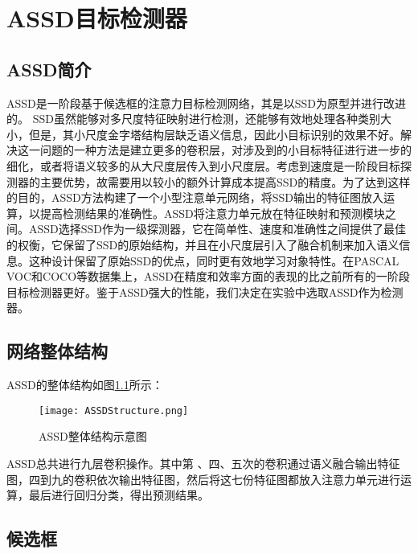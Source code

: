 
\chapter{ASSD目标检测器}

\section{ASSD简介}

ASSD\cite{ASSD}是一阶段基于候选框的注意力目标检测网络，其是以SSD\cite{SSD}为原型并进行改进的。
SSD虽然能够对多尺度特征映射进行检测，还能够有效地处理各种类别大小，但是，其小尺度金字塔结构层缺乏语义信息，因此小目标识别的效果不好。解决这一问题的一种方法是建立更多的卷积层，对涉及到的小目标特征进行进一步的细化，或者将语义较多的从大尺度层传入到小尺度层。考虑到速度是一阶段目标探测器的主要优势，故需要用以较小的额外计算成本提高SSD的精度。为了达到这样的目的，ASSD方法构建了一个小型注意单元网络，将SSD输出的特征图放入运算，以提高检测结果的准确性。ASSD将注意力单元放在特征映射和预测模块之间。ASSD选择SSD作为一级探测器，它在简单性、速度和准确性之间提供了最佳的权衡，它保留了SSD的原始结构，并且在小尺度层引入了融合机制来加入语义信息。这种设计保留了原始SSD的优点，同时更有效地学习对象特性。在PASCAL VOC和COCO等数据集上，ASSD在精度和效率方面的表现的比之前所有的一阶段目标检测器更好。鉴于ASSD强大的性能，我们决定在实验中选取ASSD作为检测器。



\section{网络整体结构}

ASSD的整体结构如图\ref{ASSDStructure}所示：

\begin{figure}
	\center
	{\texttt{[image: ASSDStructure.png]}}
	\caption{ASSD整体结构示意图}
	\label{ASSDStructure}
\end{figure}


ASSD总共进行九层卷积操作。其中第 、四、五次的卷积通过语义融合输出特征图，四到九的卷积依次输出特征图，然后将这七份特征图都放入注意力单元进行运算，最后进行回归分类，得出预测结果。

\section{候选框}


